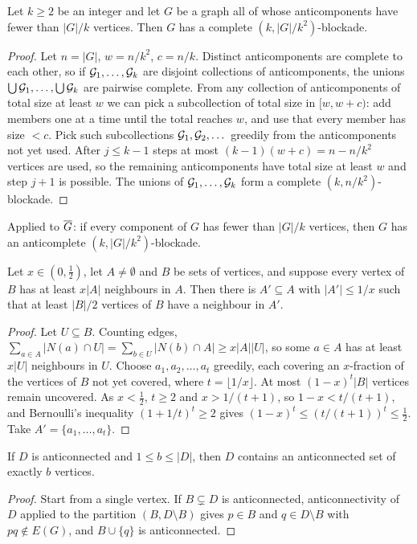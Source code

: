 \begin{lemma}\label{lem:cores}
Let $k\ge2$ be an integer and let $G$ be a graph all of whose anticomponents have fewer than $|G|/k$
vertices. Then $G$ has a complete $(k,|G|/k^2)$-blockade.
\end{lemma}
\begin{proof}
Let $n=|G|$, $w=n/k^2$, $c=n/k$. Distinct anticomponents are complete to each other, so if
$\mathcal{G}_1,\dots,\mathcal{G}_k$ are disjoint collections of anticomponents, the unions $\bigcup\mathcal{G}_1,\dots,\bigcup\mathcal{G}_k$
are pairwise complete. From any
collection of anticomponents of total size at least $w$ we can pick a subcollection of total size in
$[w,w+c)$: add members one at a time until the total reaches $w$, and use that every member has size
$<c$. Pick such subcollections $\mathcal{G}_1,\mathcal{G}_2,\dots$ greedily from the anticomponents not yet used. After
$j\le k-1$ steps at most $(k-1)(w+c)=n-n/k^2$ vertices are used, so the remaining anticomponents have
total size at least $w$ and step $j+1$ is possible. The unions of $\mathcal{G}_1,\dots,\mathcal{G}_k$ form a complete
$(k,n/k^2)$-blockade.
\end{proof}

Applied to $\overline{G}$: if every component of $G$ has fewer than $|G|/k$ vertices, then $G$ has an
anticomplete $(k,|G|/k^2)$-blockade.

\begin{lemma}\label{lem:locate}
Let $x\in(0,\frac12)$, let $A\ne\emptyset$ and $B$ be sets of vertices, and suppose every vertex of $B$ has
at least $x|A|$ neighbours in $A$. Then there is $A'\subseteq A$ with $|A'|\le1/x$ such that at least
$|B|/2$ vertices of $B$ have a neighbour in $A'$.
\end{lemma}
\begin{proof}
Let $U\subseteq B$. Counting edges, $\sum_{a\in A}|N(a)\cap U|=\sum_{b\in U}|N(b)\cap A|\ge x|A||U|$, so
some $a\in A$ has at least $x|U|$ neighbours in $U$. Choose $a_1,a_2,\dots,a_t$ greedily, each covering an
$x$-fraction of the vertices of $B$ not yet covered, where $t=\lfloor1/x\rfloor$. At most $(1-x)^t|B|$
vertices remain uncovered. As $x<\frac12$, $t\ge2$ and $x>1/(t+1)$, so $1-x<t/(t+1)$, and Bernoulli's
inequality $(1+1/t)^t\ge2$ gives $(1-x)^t\le(t/(t+1))^t\le\frac12$. Take $A'=\{a_1,\dots,a_t\}$.
\end{proof}

\begin{lemma}\label{lem:anticonn}
If $D$ is anticonnected and $1\le b\le|D|$, then $D$ contains an anticonnected set of exactly $b$
vertices.
\end{lemma}
\begin{proof}
Start from a single vertex. If $B\subsetneq D$ is anticonnected, anticonnectivity of $D$ applied to the
partition $(B,D\setminus B)$ gives $p\in B$ and $q\in D\setminus B$ with $pq\notin E(G)$, and $B\cup\{q\}$
is anticonnected.
\end{proof}

